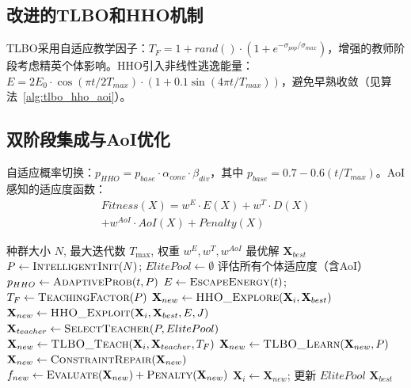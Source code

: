 \documentclass[conference]{IEEEtran}
\begin{document}
\subsection{改进的TLBO和HHO机制}
TLBO采用自适应教学因子：$T_F = 1 + rand() \cdot (1 + e^{-\sigma_{pop}/\sigma_{max}})$，增强的教师阶段考虑精英个体影响。HHO引入非线性逃逸能量：$E = 2E_0 \cdot \cos(\pi t/2T_{max}) \cdot (1 + 0.1 \sin(4\pi t/T_{max}))$，避免早熟收敛（见算法~\ref{alg:tlbo_hho_aoi}）。

\subsection{双阶段集成与AoI优化}
自适应概率切换：$p_{HHO} = p_{base} \cdot \alpha_{conv} \cdot \beta_{div}$，其中 $p_{base} = 0.7 - 0.6(t/T_{max})$。AoI感知的适应度函数：
\begin{equation}
    \begin{split}
        Fitness(X) = w^E \cdot E(X) + w^T \cdot D(X) \\ 
        + w^{AoI} \cdot AoI(X) + Penalty(X)
    \end{split}
\end{equation}

\begin{algorithm}[H]
  \small
  \caption{TLBO-HHO双阶段集成算法（含AoI优化）}
  \label{alg:tlbo_hho_aoi}
  \begin{algorithmic}[1]
    \REQUIRE 种群大小 $N$, 最大迭代数 $T_{\max}$, 权重 $w^E, w^T, w^{AoI}$
    \ENSURE 最优解 $\mathbf{X}_{best}$
    \STATE $P \leftarrow \textsc{IntelligentInit}(N)$; $ElitePool \leftarrow \emptyset$
    \STATE 评估所有个体适应度（含AoI）
        \STATE $p_{HHO} \leftarrow \textsc{AdaptiveProb}(t, P)$
        \STATE $E \leftarrow \textsc{EscapeEnergy}(t)$; $T_F \leftarrow \textsc{TeachingFactor}(P)$
                    \STATE $\mathbf{X}_{new} \leftarrow \textsc{HHO\_Explore}(\mathbf{X}_i, \mathbf{X}_{best})$
                \ELSE
                    \STATE $\mathbf{X}_{new} \leftarrow \textsc{HHO\_Exploit}(\mathbf{X}_i, \mathbf{X}_{best}, E, J)$
                \ENDIF
            \ELSE
                \STATE $\mathbf{X}_{teacher} \leftarrow \textsc{SelectTeacher}(P, ElitePool)$
                \STATE $\mathbf{X}_{new} \leftarrow \textsc{TLBO\_Teach}(\mathbf{X}_i, \mathbf{X}_{teacher}, T_F)$
                \STATE $\mathbf{X}_{new} \leftarrow \textsc{TLBO\_Learn}(\mathbf{X}_{new}, P)$
            \ENDIF
            \STATE $\mathbf{X}_{new} \leftarrow \textsc{ConstraintRepair}(\mathbf{X}_{new})$
            \STATE $f_{new} \leftarrow \textsc{Evaluate}(\mathbf{X}_{new}) + \textsc{Penalty}(\mathbf{X}_{new})$
                \STATE $\mathbf{X}_i \leftarrow \mathbf{X}_{new}$; 更新 $ElitePool$
            \ENDIF
        \ENDFOR
    \ENDFOR
    \RETURN $\mathbf{X}_{best}$
  \end{algorithmic}
\end{algorithm}
\end{document}
